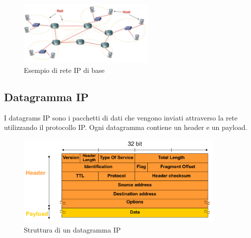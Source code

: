 \begin{figure}[h!]
    \centering
    \includegraphics[width=0.59\textwidth]{images/reteipbase.png}
    \caption{Esempio di rete IP di base}
    \label{fig:reteipbase}
\end{figure}
\subsection{Datagramma IP}
I datagrams IP sono i pacchetti di dati che vengono inviati attraverso la rete utilizzando il protocollo IP. Ogni datagramma contiene un header e un payload. 
\begin{figure}[h!]
    \centering
    \includegraphics[width=0.9\textwidth]{images/datagrammaIP.png}
    \caption{Struttura di un datagramma IP}
    \label{fig:datagrammaIP}
\end{figure}

